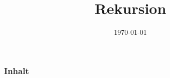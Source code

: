 \usepackage{distdocs}
\usepackage{src2listings}
\usepackage[ngerman]{babel}

\usepackage{tikz}
\usetikzlibrary{positioning}

\title{Rekursion}
\date{\today}



\newcommand{\srcbase}{../../examples}



\maketitle

\begin{fframe}
  \frametitle{Inhalt}
  \tableofcontents
\end{fframe}




